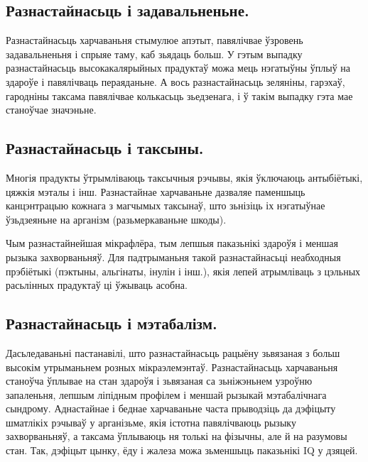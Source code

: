 \subsection{Разнастайнасьць і задавальненьне.}
Разнастайнасьць харчаваньня стымулюе апэтыт, павялічвае ўзровень задавальненьня і спрыяе таму, каб зьядаць больш. У гэтым выпадку разнастайнасьць высокакалярыйных прадуктаў можа мець нэгатыўны ўплыў на здароўе і павялічваць пераяданьне. А вось разнастайнасьць зеляніны, гарэхаў, гародніны таксама павялічвае колькасьць зьедзенага, і ў такім выпадку гэта мае станоўчае значэньне.

\subsection{Разнастайнасьць і таксыны.}
Многія прадукты ўтрымліваюць таксычныя рэчывы, якія ўключаюць антыбіётыкі, цяжкія мэталы і інш. Разнастайнае харчаваньне дазваляе паменшыць канцэнтрацыю кожнага з магчымых таксынаў, што зьнізіць іх нэгатыўнае ўзьдзеяньне на арганізм (разьмеркаваньне шкоды).

Чым разнастайнейшая мікрафлёра, тым лепшыя паказьнікі здароўя і меншая рызыка захворваньняў. Для падтрыманьня такой разнастайнасьці неабходныя прэбіётыкі (пэктыны, альгінаты, інулін і інш.), якія лепей атрымліваць з цэльных расьлінных прадуктаў ці ўжываць асобна.

\subsection{Разнастайнасьць і мэтабалізм.}
Дасьледаваньні пастанавілі, што разнастайнасьць рацыёну зьвязаная з больш высокім утрыманьнем розных мікраэлемэнтаў. Разнастайнасьць харчаваньня станоўча ўплывае на стан здароўя і зьвязаная са зьніжэньнем узроўню запаленьня, лепшым ліпідным профілем і меншай рызыкай мэтабалічнага сындрому. Аднастайнае і беднае харчаваньне часта прыводзіць да дэфіцыту шматлікіх рэчываў у арганізьме, якія істотна павялічваюць рызыку захворваньняў, а таксама ўплываюць ня толькі на фізычны, але й на разумовы стан. Так, дэфіцыт цынку, ёду і жалеза можа зьменшыць паказьнікі IQ у дзяцей.

